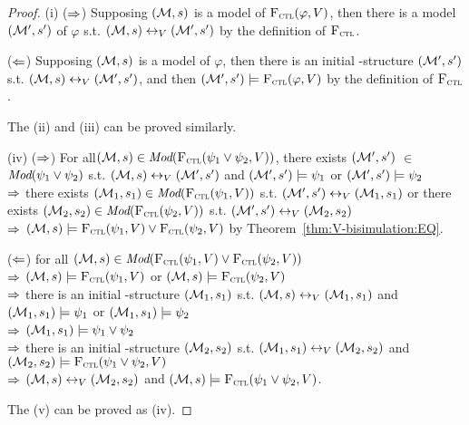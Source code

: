 \documentclass{article}
\begin{document}
 \begin{proof}
 (i) ($\Rightarrow$) Supposing $({\cal M}, s)$ is a model of ${\textsc{F}_{\textsc{ctl}}}(\varphi, V)$, then there is a model $({\cal M}',s')$ of $\varphi$ s.t. $({\cal M},s) \leftrightarrow_V ({\cal M}',s')$ by the definition of ${\textsc{F}_{\textsc{ctl}}}$.

 ($\Leftarrow$) Supposing $({\cal M}, s)$ is a model of $\varphi$, then there is an initial \MPK-structure $({\cal M}',s')$ s.t. $({\cal M},s) \leftrightarrow_V ({\cal M}',s')$, and then $({\cal M}',s') \models {\textsc{F}_{\textsc{ctl}}}(\varphi, V)$ by the definition of ${\textsc{F}_{\textsc{ctl}}}$.

 The (ii) and (iii) can be proved similarly.

 (iv) ($\Rightarrow$) For all$({\cal M},s)\in \textit{Mod}({\textsc{F}_{\textsc{ctl}}}(\psi_1 \vee \psi_2, V))$, there exists $({\cal M}',s')$ $\in$  $\textit{Mod}(\psi_1\vee \psi_2)$ s.t. $({\cal M},s) \leftrightarrow_V ({\cal M}',s')$ and $({\cal M}',s') \models \psi_1$ or $({\cal M}',s') \models \psi_2$ \\
 $\Rightarrow$ there exists $({\cal M}_1,s_1) \in \textit{Mod}({\textsc{F}_{\textsc{ctl}}}(\psi_1, V))$ s.t. $({\cal M}',s') \leftrightarrow_V ({\cal M}_1,s_1)$ or there exists $({\cal M}_2,s_2) \in \textit{Mod}({\textsc{F}_{\textsc{ctl}}}(\psi_2, V))$ s.t. $({\cal M}',s') \leftrightarrow_V ({\cal M}_2,s_2)$ \\
 $\Rightarrow$ $({\cal M},s) \models {\textsc{F}_{\textsc{ctl}}}(\psi_1, V) \vee {\textsc{F}_{\textsc{ctl}}}(\psi_2, V)$ by Theorem~\ref{thm:V-bisimulation:EQ}.

 ($\Leftarrow$) for all $({\cal M},s) \in \textit{Mod}({\textsc{F}_{\textsc{ctl}}}(\psi_1, V) \vee {\textsc{F}_{\textsc{ctl}}}(\psi_2, V))$\\
 $\Rightarrow$ $({\cal M},s) \models {\textsc{F}_{\textsc{ctl}}}(\psi_1,V)$ or $({\cal M},s) \models {\textsc{F}_{\textsc{ctl}}}(\psi_2,V)$\\
 $\Rightarrow$ there is an initial \MPK-structure $({\cal M}_1,s_1)$ s.t. $({\cal M},s) \leftrightarrow_V ({\cal M}_1,s_1)$ and $({\cal M}_1,s_1) \models \psi_1$ or  $({\cal M}_1,s_1) \models \psi_2$\\
 $\Rightarrow$ $({\cal M}_1,s_1) \models \psi_1 \vee \psi_2$\\
 $\Rightarrow$ there is an initial \MPK-structure $({\cal M}_2,s_2)$ s.t. $({\cal M}_1,s_1) \leftrightarrow_V ({\cal M}_2,s_2)$ and $({\cal M}_2,s_2) \models {\textsc{F}_{\textsc{ctl}}}(\psi_1 \vee \psi_2, V)$\\
 $\Rightarrow$ $({\cal M},s) \leftrightarrow_V ({\cal M}_2,s_2)$ and $({\cal M},s) \models {\textsc{F}_{\textsc{ctl}}}(\psi_1 \vee \psi_2, V)$.

 The (v) can be proved as (iv).
 \end{proof}
\end{document}
